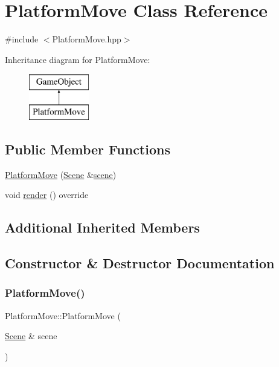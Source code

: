 \hypertarget{class_platform_move}{}\section{Platform\+Move Class Reference}
\label{class_platform_move}


{\ttfamily \#include $<$Platform\+Move.\+hpp$>$}

Inheritance diagram for Platform\+Move\+:\begin{figure}[H]
\begin{center}
\leavevmode
\includegraphics[height=2.000000cm]{class_platform_move}
\end{center}
\end{figure}
\subsection*{Public Member Functions}
\begin{DoxyCompactItemize}
\item 
\mbox{\hyperlink{class_platform_move_a508de74ec711e79d4ce42219eb7d563a}{Platform\+Move}} (\mbox{\hyperlink{class_scene}{Scene}} \&\mbox{\hyperlink{class_game_object_aeea61de934e13603696b4ed00e9fe42e}{scene}})
\item 
void \mbox{\hyperlink{class_platform_move_ac8e703c3529c602c9f0cc0a4148bcc34}{render}} () override
\end{DoxyCompactItemize}
\subsection*{Additional Inherited Members}


\subsection{Constructor \& Destructor Documentation}
\mbox{\label{class_platform_move_a508de74ec711e79d4ce42219eb7d563a}} 
\subsubsection{\texorpdfstring{Platform\+Move()}{PlatformMove()}}
{\footnotesize\ttfamily Platform\+Move\+::\+Platform\+Move (\begin{DoxyParamCaption}\item[{\mbox{\hyperlink{class_scene}{Scene}} \&}]{scene }\end{DoxyParamCaption})}



